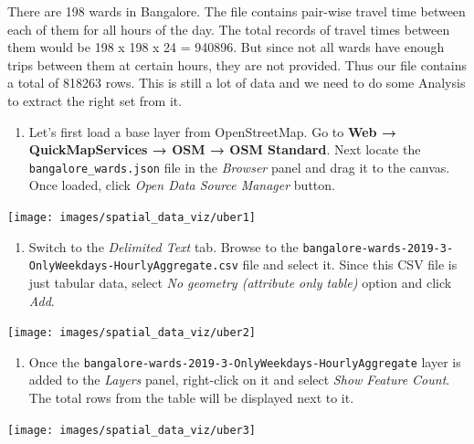 \documentclass[
  12pt,
  a4paper]{article}
\providecommand{\tightlist}{%
  \setlength{\itemsep}{0pt}\setlength{\parskip}{0pt}}
\begin{document}
There are 198 wards in Bangalore. The file contains pair-wise travel
time between each of them for all hours of the day. The total records of
travel times between them would be 198 x 198 x 24 = 940896. But since
not all wards have enough trips between them at certain hours, they are
not provided. Thus our file contains a total of 818263 rows. This is
still a lot of data and we need to do some Analysis to extract the right
set from it.

\begin{enumerate}
\def\labelenumi{\arabic{enumi}.}
\tightlist
\item
  Let's first load a base layer from OpenStreetMap. Go to \textbf{Web →
  QuickMapServices → OSM → OSM Standard}. Next locate the
  \texttt{bangalore\_wards.json} file in the \emph{Browser} panel and
  drag it to the canvas. Once loaded, click \emph{Open Data Source
  Manager} button.
\end{enumerate}

\begin{center}\texttt{[image: images/spatial\_data\_viz/uber1]} \end{center}

\begin{enumerate}
\def\labelenumi{\arabic{enumi}.}
\setcounter{enumi}{1}
\tightlist
\item
  Switch to the \emph{Delimited Text} tab. Browse to the
  \texttt{bangalore-wards-2019-3-OnlyWeekdays-HourlyAggregate.csv} file
  and select it. Since this CSV file is just tabular data, select
  \emph{No geometry (attribute only table)} option and click \emph{Add}.
\end{enumerate}

\begin{center}\texttt{[image: images/spatial\_data\_viz/uber2]} \end{center}

\begin{enumerate}
\def\labelenumi{\arabic{enumi}.}
\setcounter{enumi}{2}
\tightlist
\item
  Once the \texttt{bangalore-wards-2019-3-OnlyWeekdays-HourlyAggregate}
  layer is added to the \emph{Layers} panel, right-click on it and
  select \emph{Show Feature Count}. The total rows from the table will
  be displayed next to it.
\end{enumerate}

\begin{center}\texttt{[image: images/spatial\_data\_viz/uber3]} \end{center}
\end{document}
